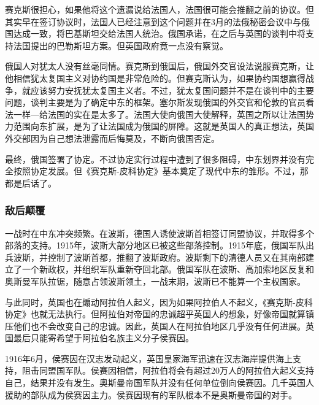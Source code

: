 \documentclass{article}
\begin{document}
赛克斯很担心，如果他将这个遗漏说给法国人，法国很可能会推翻之前的协议。但其实早在签订协议时，法国人已经注意到这个问题并在3月的法俄秘密会议中与俄国达成一致，将巴基斯坦交给法国人统治。俄国承诺，在之后与英国的谈判中将支持法国提出的巴勒斯坦方案。但英国政府竟一点没有察觉。

俄国人对犹太人没有丝毫同情。赛克斯到俄国后，俄国外交官设法说服赛克斯，让他相信犹太复国主义对协约国是非常危险的。但赛克斯认为，如果协约国想赢得战争，就应该努力安抚犹太复国主义者。不过，犹太复国问题并不是在谈判中的主要问题，谈判主要是为了确定中东的框架。塞尔斯发现俄国的外交官和伦敦的官员看法一样---给法国的实在是太多了。法国大使向俄国大使解释，英国之所以让法国势力范围向东扩展，是为了让法国成为俄国的屏障。这就是英国人的真正想法，英国外交部因为自己想法泄露而后悔莫及，不断向俄国否定。

最终，俄国签署了协定。不过协定实行过程中遭到了很多阻碍，中东划界并没有完全按照协定发展。但《赛克斯-皮科协定》基本奠定了现代中东的雏形。不过，那都是后话了。

\subsubsection{敌后颠覆}
一战时在中东冲突频繁。在波斯，德国人诱使波斯首相签订同盟协议，并取得多个部落的支持。1915年，波斯大部分地区已被这些部落控制。1915年底，俄国军队出兵波斯，并控制了波斯首都，推翻了波斯政府。波斯剩下的清德人员又在其南部建立了一个新政权，并组织军队重新夺回北部。俄国军队在波斯、高加索地区反复和奥斯曼军队拉锯，随意占领波斯领土，一战末期，波斯已不能算一个主权国家。

与此同时，英国也在煽动阿拉伯人起义，因为如果阿拉伯人不起义，《赛克斯-皮科协定》也就无法执行。但阿拉伯对帝国的忠诚超乎英国人的想象，好像帝国就算镇压他们也不会改变自己的忠诚。因此，英国人在阿拉伯地区几乎没有任何进展。英国最后只能寄希望于阿拉伯名族主义分子侯赛因。

1916年6月，侯赛因在汉志发动起义，英国皇家海军迅速在汉志海岸提供海上支持，阻击同盟国军队。侯赛因相信，阿拉伯将会有超过20万人的阿拉伯大起义支持自己，结果并没有发生。奥斯曼帝国军队并没有任何单位倒向侯赛因。几千英国人援助的部队成为侯赛因主力。侯赛因现有的军队根本不是奥斯曼帝国的对手。
\end{document}
